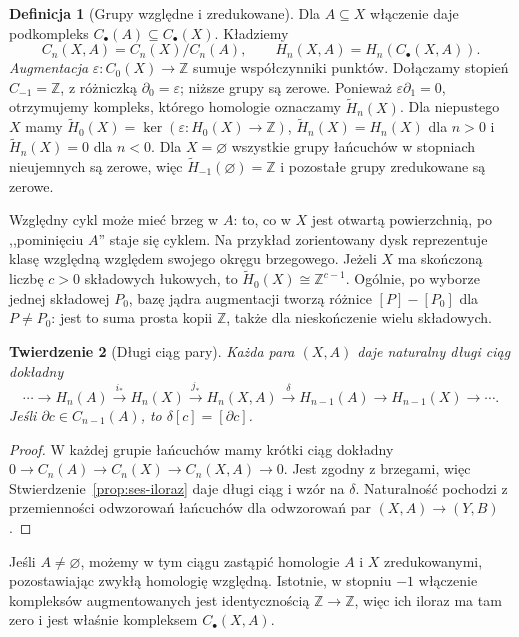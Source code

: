 \documentclass[11pt,a4paper,oneside]{report}
\newcommand{\Z}{\mathbb{Z}}
\theoremstyle{plain}
\newtheorem{twierdzenie}{Twierdzenie}[section]
\theoremstyle{definition}
\newtheorem{definicja}[twierdzenie]{Definicja}
\theoremstyle{remark}
\begin{document}
\begin{definicja}[Grupy względne i zredukowane]
\label{def:homologia-wzgledna}
Dla $A\subseteq X$ włączenie daje
podkompleks $C_\bullet(A)\subseteq C_\bullet(X)$.
Kładziemy
\[
 C_n(X,A)=C_n(X)/C_n(A),\qquad
 H_n(X,A)=H_n(C_\bullet(X,A)).
\]
\emph{Augmentacja} $\varepsilon:C_0(X)\to\Z$ sumuje
współczynniki punktów. Dołączamy stopień $C_{-1}=\Z$,
z różniczką $\partial_0=\varepsilon$; niższe grupy są zerowe.
Ponieważ $\varepsilon\partial_1=0$, otrzymujemy kompleks,
którego homologie oznaczamy $\widetilde H_n(X)$.
Dla niepustego $X$ mamy
$\widetilde H_0(X)=\ker(\varepsilon:H_0(X)\to\Z)$,
$\widetilde H_n(X)=H_n(X)$ dla $n>0$ i
$\widetilde H_n(X)=0$ dla $n<0$.
Dla $X=\varnothing$ wszystkie grupy łańcuchów w stopniach
nieujemnych są zerowe, więc $\widetilde H_{-1}(\varnothing)=\Z$
i pozostałe grupy zredukowane są zerowe.
\end{definicja}

Względny cykl może mieć brzeg w $A$:
to, co w $X$ jest otwartą powierzchnią,
po ,,pominięciu $A$'' staje się cyklem.
Na przykład zorientowany dysk reprezentuje klasę względną
względem swojego okręgu brzegowego.
Jeżeli $X$ ma skończoną liczbę $c>0$ składowych łukowych,
to $\widetilde H_0(X)\cong\Z^{c-1}$.
Ogólnie, po wyborze jednej składowej $P_0$, bazę jądra
augmentacji tworzą różnice $[P]-[P_0]$ dla $P\ne P_0$:
jest to suma prosta kopii $\Z$, także dla nieskończenie wielu składowych.

\begin{twierdzenie}[Długi ciąg pary]
\label{thm:les-pary}
Każda para $(X,A)$ daje naturalny
długi ciąg dokładny
\begin{equation}\label{eq:les-pary}
 \cdots\to H_n(A)\xrightarrow{i_*}H_n(X)
 \xrightarrow{j_*}H_n(X,A)
 \xrightarrow{\delta}H_{n-1}(A)
 \to H_{n-1}(X)\to\cdots.
\end{equation}
Jeśli $\partial c\in C_{n-1}(A)$,
to $\delta[c]=[\partial c]$.
\end{twierdzenie}
\begin{proof}
W każdej grupie łańcuchów mamy
krótki ciąg dokładny
$0\to C_n(A)\to C_n(X)\to C_n(X,A)\to0$.
Jest zgodny z brzegami, więc
Stwierdzenie~\ref{prop:ses-iloraz}
daje długi ciąg i wzór na $\delta$.
Naturalność pochodzi z przemienności
odwzorowań łańcuchów dla odwzorowań
par $(X,A)\to(Y,B)$.
\end{proof}

Jeśli $A\ne\varnothing$, możemy w tym ciągu zastąpić homologie
$A$ i $X$ zredukowanymi, pozostawiając zwykłą homologię względną.
Istotnie, w stopniu $-1$ włączenie kompleksów augmentowanych
jest identycznością $\Z\to\Z$, więc ich iloraz ma tam zero
i jest właśnie kompleksem $C_\bullet(X,A)$.
\end{document}
